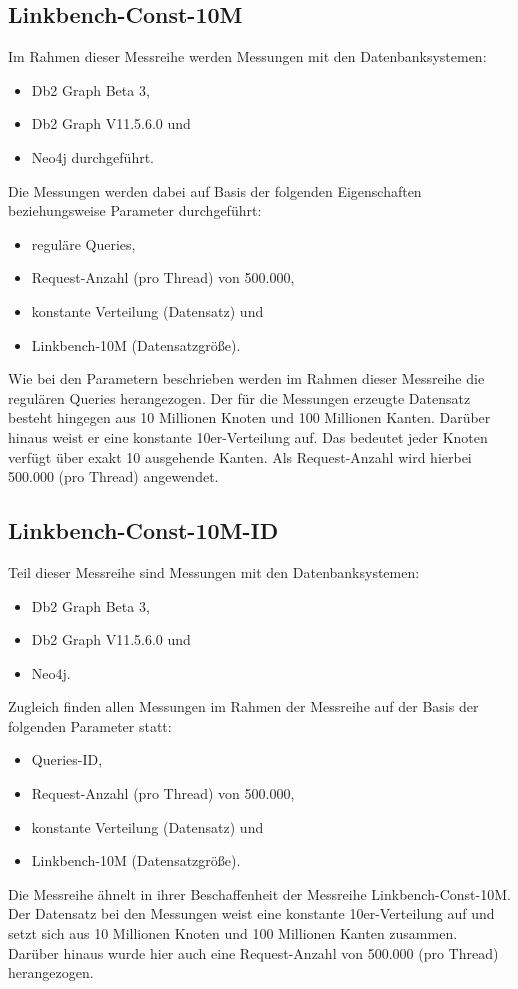 \subsection{Linkbench-Const-10M}
Im Rahmen dieser Messreihe werden Messungen mit den Datenbanksystemen:
\begin{itemize}
    \item Db2 Graph Beta 3,
    \item Db2 Graph V11.5.6.0 und 
    \item Neo4j durchgeführt. 
\end{itemize}
Die Messungen werden dabei auf Basis der folgenden Eigenschaften beziehungsweise Parameter durchgeführt:
\begin{itemize}
    \item reguläre Queries,
    \item Request-Anzahl (pro Thread) von 500.000, 
    \item konstante Verteilung (Datensatz) und
    \item Linkbench-10M (Datensatzgröße).
\end{itemize}
Wie bei den Parametern beschrieben werden im Rahmen dieser Messreihe die regulären Queries herangezogen. Der für die Messungen erzeugte Datensatz besteht hingegen aus 10 Millionen Knoten und 100 Millionen Kanten. Darüber hinaus weist er eine konstante 10er-Verteilung auf. Das bedeutet jeder Knoten verfügt über exakt 10 ausgehende Kanten. Als Request-Anzahl wird hierbei 500.000 (pro Thread) angewendet.

\subsection{Linkbench-Const-10M-ID}
Teil dieser Messreihe sind Messungen mit den Datenbanksystemen:
\begin{itemize}
    \item Db2 Graph Beta 3,
    \item Db2 Graph V11.5.6.0 und 
    \item Neo4j. 
\end{itemize}

Zugleich finden allen Messungen im Rahmen der Messreihe auf der Basis der folgenden Parameter statt:
\begin{itemize}
    \item Queries-ID,
    \item Request-Anzahl (pro Thread) von 500.000, 
    \item konstante Verteilung (Datensatz) und
    \item Linkbench-10M (Datensatzgröße).
\end{itemize}
Die Messreihe ähnelt in ihrer Beschaffenheit der Messreihe Linkbench-Const-10M. Der Datensatz bei den Messungen weist eine konstante 10er-Verteilung auf und setzt sich aus 10 Millionen Knoten und 100 Millionen Kanten zusammen. Darüber hinaus wurde hier auch eine Request-Anzahl von 500.000 (pro Thread) herangezogen.


